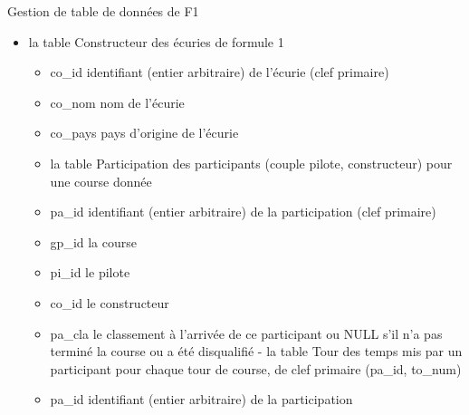 \begin{exo}[PC][1][colle]{Gestion de table de données de F1}
\begin{itemize}
        \begin{itemize}
            \item pi\_id identifiant (entier arbitraire) du pilote (clef primaire)
            
            \item pi\_nom nom de famille du pilote
            
            \item pi\_prenom prénom du pilote
            
        \end{itemize}
            \item la table Constructeur des écuries de formule 1
            
            \begin{itemize}
                \item co\_id identifiant (entier arbitraire) de l'écurie (clef primaire)
                
                \item co\_nom nom de l'écurie
                
                \item co\_pays pays d'origine de l'écurie
                
                \item la table Participation des participants (couple pilote, constructeur) pour une course donnée
                
                \item pa\_id identifiant (entier arbitraire) de la participation (clef primaire)
                
                \item gp\_id la course
                
                \item pi\_id le pilote
                
                \item co\_id le constructeur
                
                \item pa\_cla le classement à l'arrivée de ce participant ou NULL s'il n'a pas terminé la course ou a été disqualifié - la table Tour des temps mis par un participant pour chaque tour de course, de clef primaire (pa\_id, to\_num)
                
                \item pa\_id identifiant (entier arbitraire) de la participation
                

\end{itemize}
\end{itemize}
\end{exo}
